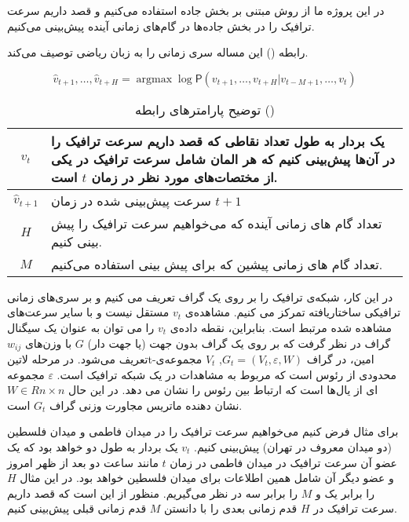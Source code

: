 در این پروژه ما از روش مبتنی بر بخش جاده استفاده می‌کنیم و قصد داریم سرعت ترافیک را در بخش جاده‌ها در گام‌های زمانی آینده پیش‌بینی می‌کنیم.

رابطه () این مساله سری زمانی را به زبان ریاضی توصیف می‌کند.

\begin{equation}
  \label{eq:base}
  \hat{v}_{t+1}, \ldots,  \hat{v}_{t+H} = \mathop{\mathrm{argmax}} \log \mathsf{P}({v}_{t+1}, \ldots,  v_{t+H} | v_{t-M+1} , \ldots,  v_{t})
\end{equation}

\begin{table}[h]
  \centering
  \caption{توضیح پارامترهای رابطه ()}
  \begin{tabular}{|c|p{}|}
    \hline
    $v_{t}$ & یک بردار به طول تعداد نقاطی که قصد داریم سرعت ترافیک را در آن‌ها پیش‌بینی کنیم که هر المان شامل سرعت ترافیک در یکی از مختصات‌های مورد نظر در زمان $t$ است. \\
    \hline
    $\hat{v}_{t+1}$ & سرعت پیش‌بینی شده در زمان $t+1$ \\
    \hline
    $H$ & تعداد گام های زمانی آینده که می‌خواهیم سرعت ترافیک را پیش بینی کنیم. \\
    \hline
    $M$ & تعداد گام های زمانی پیشین که برای پیش بینی استفاده می‌کنیم. \\
    \hline
  \end{tabular}
  \label{tbl:base}
\end{table}

در این کار، شبکه‌ی ترافیک را بر روی یک گراف تعریف می کنیم و بر سری‌های زمانی ترافیکی ساختاریافته تمرکز می کنیم. مشاهده‌ی $v_{t}$ مستقل نیست و با سایر سرعت‌های مشاهده شده مرتبط است. بنابراین، نقطه داده‌ی $v_{t}$ را می توان به عنوان یک سیگنال گراف در نظر گرفت که بر روی یک گراف بدون جهت (یا جهت دار) $G$ با وزن‌های $w_{ij}$ تعریف می‌شود. در مرحله ‌لاتین{t}-امین، در گراف $G_{t} = (V_{t}, \varepsilon , W)$,  $V_{t}$ مجموعه‌ی محدودی از رئوس است که مربوط به مشاهدات در یک شبکه ترافیک است. $\varepsilon$ مجموعه ای از یال‌ها است که ارتباط بین رئوس را نشان می دهد. در این حال $W ∈ R n×n$ نشان دهنده ماتریس مجاورت وزنی گراف $G_{t}$ است.

برای مثال فرض کنیم می‌خواهیم سرعت ترافیک را در میدان فاطمی و میدان فلسطین (دو میدان معروف در تهران) پیش‌بینی کنیم.
$v_{t}$ یک بردار به طول دو خواهد بود که یک عضو آن سرعت ترافیک در میدان فاطمی در زمان $t$ مانند ساعت دو بعد از ظهر امروز و عضو دیگر آن شامل همین اطلاعات برای میدان فلسطین خواهد بود.
در این مثال $H$ را برابر یک و $M$ را برابر سه در نظر می‌گیریم. منظور از  این است که قصد داریم سرعت ترافیک در $H$ قدم زمانی بعدی را با دانستن $M$ قدم زمانی قبلی پیش‌بینی کنیم.
